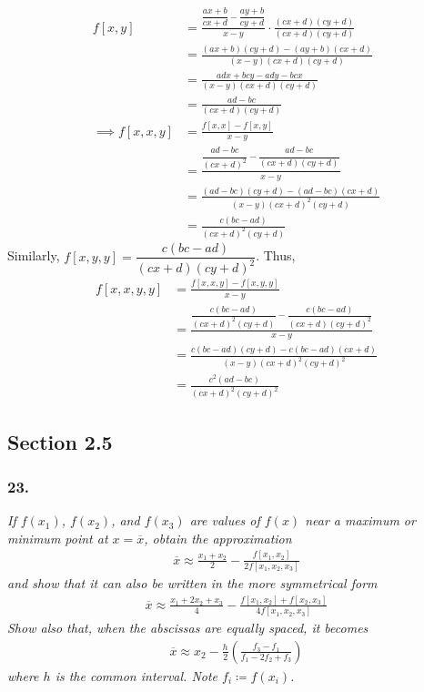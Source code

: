 \documentclass[12pt]{article}
\begin{document}
\begin{align*}
f[x, y] &= \frac{\dfrac{ax + b}{cx + d} - \dfrac{ay + b}{cy + d}}{x - y} \cdot \frac{(cx + d)(cy + d)}{(cx + d)(cy + d)} \\[.1cm]
&= \frac{(ax + b)(cy + d) - (ay + b)(cx + d)}{(x - y)(cx + d)(cy + d)} \\[.1cm]
&= \frac{adx + bcy - ady - bcx}{(x -y)(cx + d)(cy + d)} \\[.1cm]
&= \boxed{\frac{ad - bc}{(cx + d)(cy + d)}} \\[.1cm]
\implies f[x, x, y] &= \frac{f[x, x] - f[x, y]}{x - y} \\[.1cm]
&= \frac{\dfrac{ad - bc}{(cx + d)^2} - \dfrac{ad - bc}{(cx + d)(cy + d)}}{x - y} \\[.1cm]
&= \frac{(ad - bc)(cy + d) - (ad - bc)(cx + d)}{(x - y)(cx + d)^2(cy + d)} \\[.1cm]
&= \boxed{\frac{c(bc - ad)}{(cx + d)^2(cy + d)}}
\end{align*}
Similarly, $f[x, y, y] = \dfrac{c(bc - ad)}{(cx + d)(cy + d)^2}$.  Thus,
\begin{align*}
f[x, x, y, y] &= \frac{f[x, x, y] - f[x, y, y]}{x - y} \\[.1cm]
&= \frac{\dfrac{c(bc - ad)}{(cx + d)^2(cy + d)} - \dfrac{c(bc - ad)}{(cx + d)(cy + d)^2}}{x - y} \\[.1cm]
&= \frac{c(bc - ad)(cy + d) - c(bc - ad)(cx + d)}{(x - y)(cx + d)^2(cy + d)^2} \\[.1cm]
&= \boxed{\frac{c^2(ad - bc)}{(cx + d)^2(cy + d)^2}}
\end{align*}

\subsection*{Section 2.5}

\subsubsection*{23.}

{\it If $f(x_1)$, $f(x_2)$, and $f(x_3)$ are values of $f(x)$ near a maximum or minimum point at $x = \overline{x}$, obtain the approximation}
\begin{align*}
\overline{x} \approx \frac{x_1 + x_2}{2} - \frac{f[x_1, x_2]}{2f[x_1, x_2, x_3]}
\end{align*}
{\it and show that it can also be written in the more symmetrical form}
\begin{align*}
\overline{x} \approx \frac{x_1 + 2x_2 + x_3}{4} - \frac{f[x_1, x_2] + f[x_2, x_3]}{4f[x_1, x_2, x_3]}
\end{align*}
{\it Show also that, when the abscissas are equally spaced, it becomes}
\begin{align*}
\overline{x} \approx x_2 - \frac{h}{2}\left(\frac{f_3 - f_1}{f_1 - 2f_2 + f_3}\right)
\end{align*}
{\it where $h$ is the common interval. Note $f_i \coloneqq f(x_i)$.} \\
\end{document}
